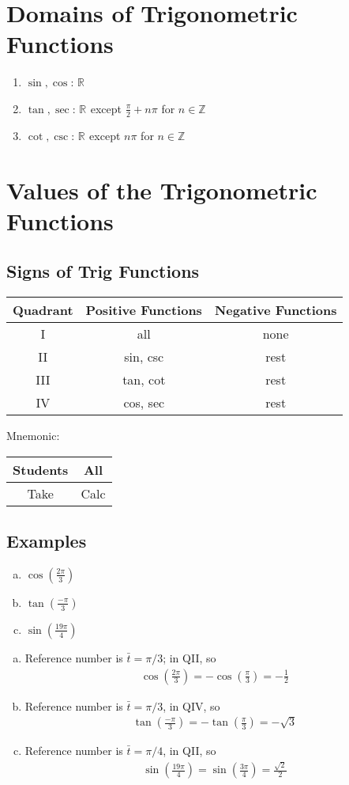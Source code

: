 \documentclass{tufte-handout}
\newcommand{\R}[1]{\mathbb{R}^{#1}}
\newcommand{\Z}[1]{\mathbb{Z}^{#1}}
\begin{document}
\section{Domains of Trigonometric Functions}
\begin{enumerate}
\item $\sin, \cos$: $\R{}$
\item $\tan, \sec$: $\R{}$ except $\frac{\pi}{2} + n\pi$ for $n \in \Z{}$
\item $\cot, \csc$: $\R{}$ except $n\pi$ for $n \in \Z{}$
\end{enumerate}

\section{Values of the Trigonometric Functions}

\subsection{Signs of Trig Functions}
\begin{tabular}{c|c|c}
Quadrant & Positive Functions & Negative Functions \\ \hline
I & all & none \\
II & sin, csc & rest \\
III & tan, cot & rest \\
IV & cos, sec & rest
\end{tabular} \qquad
Mnemonic: 
\begin{tabular}{c|c}
Students & All \\ \hline
Take & Calc
\end{tabular}

\subsection{Examples}
\begin{enumerate}[(a)]
\item $\cos\left( \frac{2\pi}{3} \right)$
\item $\tan\left( \frac{-\pi}{3} \right)$
\item $\sin\left( \frac{19\pi}{4} \right)$
\end{enumerate}
{\color{blue}
\begin{enumerate}[(a)]
\item Reference number is $\bar{t} = \pi/3$; in QII, so 
\begin{align*}
\cos\left( \frac{2\pi}{3} \right) = -\cos\left( \frac{\pi}{3} \right) = -\frac{1}{2}
\end{align*}
\item Reference number is $\bar{t} = \pi/3$, in QIV, so
\begin{align*}
\tan\left( \frac{-\pi}{3} \right) = -\tan\left( \frac{\pi}{3} \right) = -\sqrt{3}
\end{align*}
\item Reference number is $\bar{t} = \pi/4$, in QII, so
\begin{align*}
\sin\left( \frac{19\pi}{4} \right) = \sin\left( \frac{3\pi}{4} \right) = \frac{\sqrt{2}}{2}
\end{align*}
\end{enumerate}
}
\end{document}
